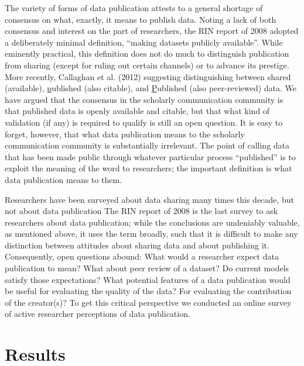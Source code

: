 \documentclass[10pt]{article}
\begin{document}
The variety of forms of data publication attests to a general shortage of consensus on what, exactly, it means to publish data.
Noting a lack of both consensus and interest on the part of researchers, the RIN report of 2008 adopted a deliberately minimal definition, ``making datasets publicly available''\cite{swan_share_2008}.
While eminently practical, this definition does not do much to distinguish publication from sharing (except for ruling out certain channels) or to advance its prestige.
More recently, Callaghan et al. (2012) suggesting distinguishing between shared (available), \underline{p}ublished (also citable), and \underline{P}ublished (also peer-reviewed) data\cite{callaghan_making_2012}.
We have argued that the consensus in the scholarly communication community is that published data is openly available and citable, but that what kind of validation (if any) is required to qualify is still an open question\cite{kratz_data_2014}.
It is easy to forget, however, that what data publication means to the scholarly communication community is substantially irrelevant.
The point of calling data that has been made public through whatever particular process ``published'' is to exploit the meaning of the word to researchers; the important definition is what data publication means to them. 

Researchers have been surveyed about data sharing many times this decade, but not about data publication\cite{harley_assessing_2010, westra_data_2010, tenopir_data_2011, kim_institutional_2012, scaramozzino_study_2012, williams_gathering_2013, bobrow_establishing_2014, strasser_dataup_2014}
The RIN report of 2008 is the last survey to ask researchers about data publication; while the conclusions are undeniably valuable, as mentioned above, it uses the term broadly, such that it is difficult to make any distinction between attitudes about sharing data and about publishing it\cite{swan_share_2008}.
Consequently, open questions abound:
What would a researcher expect data publication to mean?
What about peer review of a dataset?
Do current models satisfy those expectations?
What potential features of a data publication would be useful for evaluating the quality of the data?
For evaluating the contribution of the creator(s)?
To get this critical perspective we conducted an online survey of active researcher perceptions of data publication.


\section*{Results}
\end{document}
